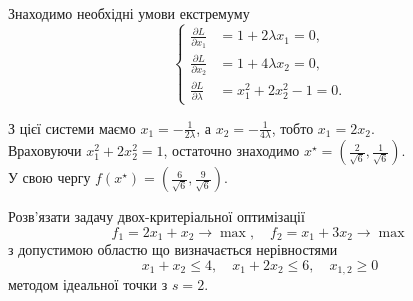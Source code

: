 \begin{solution}
    Знаходимо необхідні умови екстремуму
    \begin{equation*}
        \left\{
            \begin{aligned}
                \frac{\partial L}{\partial x_1} &= 1 + 2 \lambda x_1 = 0, \\
                \frac{\partial L}{\partial x_2} &= 1 + 4 \lambda x_2 = 0, \\
                \frac{\partial L}{\partial \lambda} &= x_1^2 + 2 x_2^2 - 1 = 0.
            \end{aligned}
        \right.
    \end{equation*}
    
    З цієї системи маємо $x_1 = -\frac{1}{2\lambda}$, а $x_2 = - \frac{1}{4\lambda}$, тобто $x_1 = 2 x_2$. \\
    
    Враховуючи $x_1^2 + 2 x_2^2 = 1$, остаточно знаходимо $x^\star = \left( \frac{2}{\sqrt{6}}, \frac{1}{\sqrt{6}} \right)$. \\
    
    У свою чергу $f(x^\star) = \left( \frac{6}{\sqrt{6}}, \frac{9}{\sqrt{6}} \right)$.
\end{solution}

\newpage


    

\begin{problem}
    Розв'язати задачу двох-критеріальної оптимізації \[ f_1 = 2 x_1 + x_2 \to \max, \quad f_2 = x_1 + 3 x_2 \to \max \] з допустимою областю що визначається нерівностями \[ x_1 + x_2 \le 4, \quad x_1 + 2 x_2 \le 6, \quad x_{1, 2} \ge 0 \] методом ідеальної точки з $s = 2$.
\end{problem}

